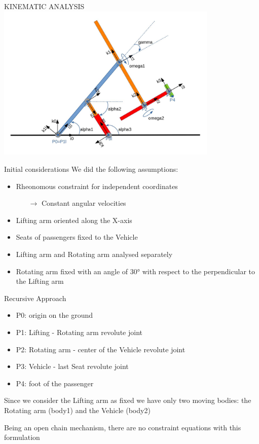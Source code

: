\documentclass{beamer}              %
\begin{document}
	\begin{frame}{KINEMATIC ANALYSIS}			
		\includegraphics[width=300pt]{immagini/2D_pegasus.jpg}
	\end{frame}    
	\begin{frame}{Initial considerations}
		We did the following assumptions:
		
		\medskip 
		
		\begin{itemize}
			\item Rheonomous constraint for independent coordinates
			\begin{itemize}
				\item[$\rightarrow$] Constant angular velocities
			\end{itemize} 
			\item Lifting arm oriented along the X-axis
			\item Seats of passengers fixed to the Vehicle
			\item Lifting arm and Rotating arm analysed separately
			\item Rotating arm fixed with an angle of 30° with respect to the perpendicular to the Lifting arm
		\end{itemize}
	\end{frame}
	\begin{frame}{Recursive Approach}
		\small
		\begin{itemize}
			\item P0: origin on the ground 
			\item P1: Lifting - Rotating arm revolute joint
			\item P2: Rotating arm - center of the Vehicle revolute joint
			\item P3: Vehicle - last Seat revolute joint 
			\item P4: foot of the passenger
		\end{itemize}
		
		\medskip
		
		Since we consider the Lifting arm as fixed we have only two moving bodies: the Rotating arm (body1) and the Vehicle (body2)
		
		\smallskip
		
		Being an open chain mechanism, there are no constraint equations with this formulation  
	\end{frame}	    
\end{document}
